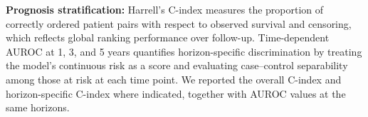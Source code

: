 \documentclass{article}
\begin{document}

\textbf{Prognosis stratification:} Harrell’s C-index measures the proportion of correctly ordered patient pairs with respect to observed survival and censoring, which reflects global ranking performance over follow-up. Time-dependent AUROC at 1, 3, and 5 years quantifies horizon-specific discrimination by treating the model’s continuous risk as a score and evaluating case–control separability among those at risk at each time point. We reported the overall C-index and horizon-specific C-index where indicated, together with AUROC values at the same horizons.
\end{document}
